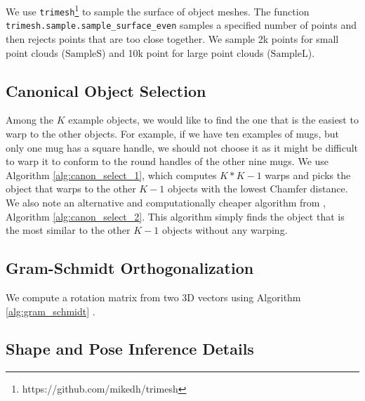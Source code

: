 \documentclass{article}
\begin{document}
We use \texttt{trimesh}\footnote{https://github.com/mikedh/trimesh} to sample the surface of object meshes. The function \texttt{trimesh.sample.sample\_surface\_even} samples a specified number of points and then rejects points that are too close together. We sample 2k points for small point clouds ($\mathrm{SampleS}$) and 10k point for large point clouds ($\mathrm{SampleL}$).

\subsection{Canonical Object Selection}
\label{appendix:method:canonical}

Among the $K$ example objects, we would like to find the one that is the easiest to warp to the other objects. For example, if we have ten examples of mugs, but only one mug has a square handle, we should not choose it as it might be difficult to warp it to conform to the round handles of the other nine mugs. We use Algorithm \ref{alg:canon_select_1}, which computes $K * K-1$ warps and picks the object that warps to the other $K-1$ objects with the lowest Chamfer distance. We also note an alternative and computationally cheaper algorithm from \citet{thompson21shapebased}, Algorithm \ref{alg:canon_select_2}. This algorithm simply finds the object that is the most similar to the other $K-1$ objects without any warping.





\subsection{Gram-Schmidt Orthogonalization}

We compute a rotation matrix from two 3D vectors using Algorithm \ref{alg:gram_schmidt} \cite{park22learning}.



\subsection{Shape and Pose Inference Details}
\label{appendix:method:inference}
\end{document}
